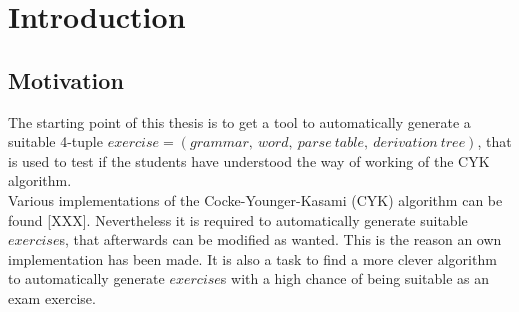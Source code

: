 
\section{Introduction}\label{Introduction}

\subsection{Motivation}

The starting point of this thesis is to get a tool to automatically generate a suitable 4-tuple $exercise = (grammar,\ word,\ parse\ table,\ derivation\ tree)$, that is used to test if the students have understood the way of working of the CYK algorithm.\\
Various implementations of the Cocke-Younger-Kasami (CYK) algorithm can be found [XXX]. Nevertheless it is required to automatically generate suitable $exercise$s, that afterwards can be modified as wanted. This is the reason an own implementation has been made. It is also a task to find a more clever algorithm to automatically generate $exercise$s with a high chance of being suitable as an exam exercise.

